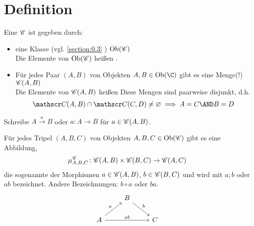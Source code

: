 \section{Definition}\label{section:1.2}
\begin{definition}
	Eine  $\mathscr C$ ist gegeben durch:
	\begin{itemize}
		\item eine Klasse (vgl. \ref{section:0.3}
		) $\operatorname{Ob}(\mathscr C)$\\
		Die Elemente von $\operatorname{Ob}(\mathscr C)$ heißen .
		\item Für jedes Paar $(A,B)$ von Objekten $A,B\in\Ob(\C)$ gibt es eine Menge(!) $\mathscr C(A,B)$\\
		Die Elemente von $\mathscr C(A,B)$ heißen  
		Diese Mengen sind paarweise disjunkt, d.h.
		\begin{align*}
			\Cat(A,B)\cap\Cat(C,D)\neq\emptyset
			\implies A=C\AND B=D
		\end{align*}
	\end{itemize}
\end{definition}

\begin{notation}
	Schreibe $A\overset{a}{\longrightarrow}B$ oder $a\colon A\to B$ für $a\in\mathscr C(A,B)$.
\end{notation}

\begin{lemma}
	Für jedes Tripel $(A,B,C)$ von Objekten $A,B,C\in\operatorname{Ob}(\mathscr C)$ gibt es eine Abbildung, 
	\begin{align*}\index{Komposition}
		\mu_{A,B,C}^\Cat\colon\Cat(A,B)\times\Cat(B,C)\to\Cat(A,C)
	\end{align*}
	die sogenannte  der Morphismen $a\in\mathscr C(A,B)$, $b\in\mathscr C(B,C)$ und wird mit $a;b$ oder $ab$ bezeichnet.
	Andere Bezeichnungen: $b\circ a$ oder $ba$.
	$$
	\begin{tikzcd}
                                   & B \arrow[rd, "b"] &   \\
A \arrow[ru, "a"] \arrow[rr, "ab"] &                   & C
	\end{tikzcd}
	$$
\end{lemma}

